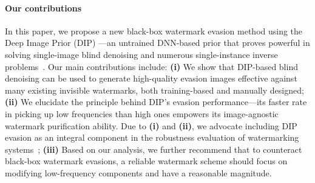 \paragraph{Our contributions} 
In this paper, we propose a new black-box watermark evasion method using the Deep Image Prior (DIP) \citep{ulyanov2018deep}---an untrained DNN-based prior that proves powerful in solving single-image blind denoising and numerous single-instance inverse problems~\citep{DBLP_journals_pami_QayyumISBBQ23,Tirer2023DeepIL,zhuang2023advancing}. Our main contributions include: \textbf{(i)} We show that DIP-based blind denoising can be used to generate high-quality evasion images effective against many existing invisible watermarks, both training-based and manually designed; \textbf{(ii)} We elucidate the principle behind DIP's evasion performance---its faster rate in picking up low frequencies than high ones empowers its image-agnostic watermark purification ability. Due to \textbf{(i)} and \textbf{(ii)}, we advocate including DIP evasion as an integral component in the robustness evaluation of watermarking systems~\citep{saberi2023robustness,an2024benchmarking}; \textbf{(iii)} Based on our analysis, we further recommend that to counteract black-box watermark evasions, a reliable watermark scheme should focus on modifying low-frequency components and have a reasonable magnitude. 